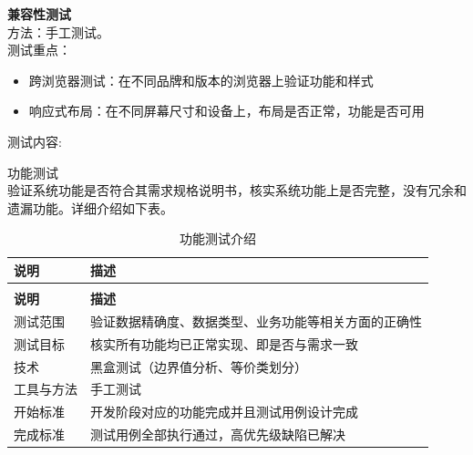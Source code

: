 \begin{levellist}
\begin{levellist}
        \item \textbf{兼容性测试} \\
        方法：手工测试。\\
        测试重点：
        \begin{itemize}
            \item  跨浏览器测试：在不同品牌和版本的浏览器上验证功能和样式
            \item  响应式布局：在不同屏幕尺寸和设备上，布局是否正常，功能是否可用
        \end{itemize}
        测试内容:
        \begin{levellist}
            \item 功能测试 \\
            验证系统功能是否符合其需求规格说明书，核实系统功能上是否完整，没有冗余和遗漏功能。详细介绍如下表。

            \begin{longtable}{>{\centering\arraybackslash}m{2.5cm} >{\centering\arraybackslash}m{12cm}}

                \caption{功能测试介绍} \label{tab:training}            \\

                \toprule
                \textbf{说明} & \textbf{描述}                        \\
                \midrule
                \endfirsthead

                \multicolumn{2}{c}{{\tablename\ \thetable{} 续表}} \\
                \toprule
                \textbf{说明} & \textbf{描述}                        \\
                \midrule
                \endhead

                \bottomrule
                \endfoot


                测试范围        & 验证数据精确度、数据类型、业务功能等相关方面的正确性         \\
                测试目标        & 核实所有功能均已正常实现、即是否与需求一致              \\
                技术          & 黑盒测试（边界值分析、等价类划分）                  \\
                工具与方法       & 手工测试                               \\
                开始标准        & 开发阶段对应的功能完成并且测试用例设计完成              \\
                完成标准        & 测试用例全部执行通过，高优先级缺陷已解决               \\
            \end{longtable}



\end{levellist}
\end{levellist}
\end{levellist}

